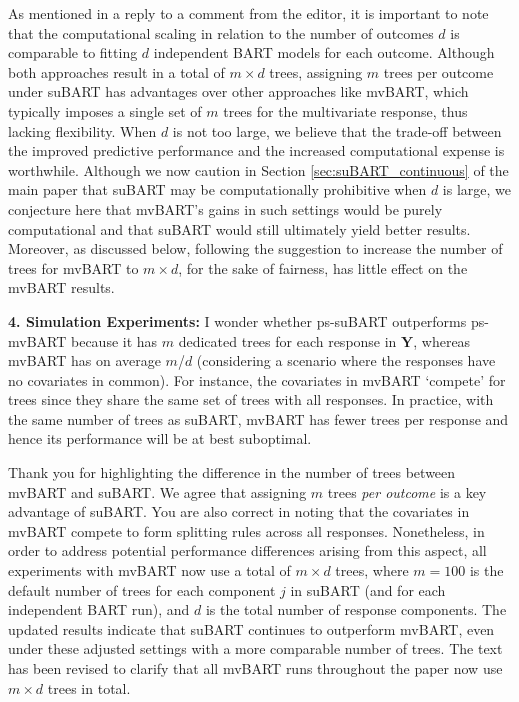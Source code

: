 \documentclass{article}
\begin{document}
As mentioned in a reply to a comment from the editor, it is important to note that the computational scaling in relation to the number of outcomes $d$ is comparable to fitting $d$ independent BART models for each outcome. Although both approaches result in a total of $m\times d$ trees, assigning $m$ trees per outcome under suBART has advantages over other approaches like mvBART, which typically imposes a single set of $m$ trees for the multivariate response, thus lacking flexibility. When $d$ is not too large, we believe that the trade-off between the improved predictive performance and the increased computational expense is worthwhile. Although we now caution in Section \ref{sec:suBART_continuous} of the main paper that suBART may be computationally prohibitive when $d$ is large, we conjecture here that mvBART's gains in such settings would be purely computational and that suBART would still ultimately yield better results. Moreover, as discussed below, following the suggestion to increase the number of trees for mvBART to $m\times d$, for the sake of fairness, has little effect on the mvBART results.

\begin{mdframed}
   \textbf{4. Simulation Experiments:} I wonder whether ps-suBART outperforms ps-mvBART because it has $m$ dedicated trees for each response in $\mathbf{Y}$, whereas mvBART has on average $m$/$d$ (considering a scenario where the responses have no covariates in common). For instance, the covariates in mvBART `compete' for trees since they share the same set of trees with all responses. In practice, with the same number of trees as suBART, mvBART has fewer trees per response and hence its performance will be at best suboptimal.
\end{mdframed}

Thank you for highlighting the difference in the number of trees between mvBART and suBART. We agree that assigning $m$ trees \emph{per outcome} is a key advantage of suBART. You are also correct in noting that the covariates in mvBART compete to form splitting rules across all responses. Nonetheless, in order to address potential performance differences arising from this aspect, all experiments with mvBART now use a total of $m \times d$ trees, where $m=100$ is the default number of trees for each component $j$ in suBART (and for each independent BART run), and $d$ is the total number of response components. The updated results indicate that suBART continues to outperform mvBART, even under these adjusted settings with a more comparable number of trees. The text has been revised to clarify that all mvBART runs throughout the paper now use $m \times d$ trees in total.
\end{document}
